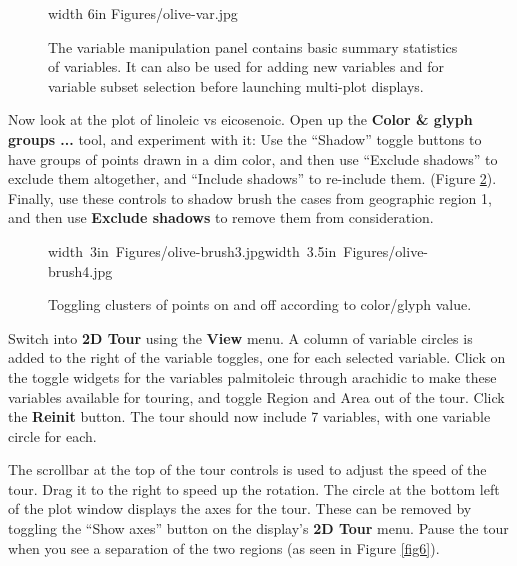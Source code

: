 \documentclass[11pt]{article}
\def\Widget#1{\textbf{#1}}
\begin{document}
\begin{figure}[htp]
\pdfimage width 6in {Figures/olive-var.jpg}
\caption{The variable manipulation panel contains basic summary 
statistics of variables. It can also be used for adding new variables
and for variable subset selection before launching multi-plot
displays.
}%
\label{fig4}
\end{figure}

Now look at the plot of linoleic vs eicosenoic. Open up the
\Widget{Color \& glyph groups ...} tool, and experiment with it: Use
the ``Shadow'' toggle buttons to have groups of points drawn in a dim
color, and then use ``Exclude shadows'' to exclude them altogether,
and ``Include shadows'' to re-include them.  (Figure \ref{fig5}).
Finally, use these controls to shadow brush the cases from geographic
region 1, and then use \Widget{Exclude shadows} to remove them from
consideration.

\begin{figure}[htp]
\hbox{\pdfimage width 3in {Figures/olive-brush3.jpg}\pdfimage width 3.5in {Figures/olive-brush4.jpg}}
\caption{Toggling clusters of points on and off according to color/glyph value.}
\label{fig5}
\end{figure}

Switch into \Widget{2D Tour} using the \Widget{View} menu. A column of
variable circles is added to the right of the variable toggles, one
for each selected variable.  Click on the toggle widgets for the
variables palmitoleic through arachidic to make these variables
available for touring, and toggle Region and Area out of the tour.
Click the \Widget{Reinit} button.  The tour should now include 7
variables, with one variable circle for each.

The scrollbar at the top of the tour controls is used to adjust the
speed of the tour.  Drag it to the right to speed up the rotation.
The circle at the bottom left of the plot window displays the axes for
the tour. These can be removed by toggling the ``Show axes'' button on
the display's \Widget{2D Tour} menu.  Pause the tour when you see a
separation of the two regions (as seen in Figure \ref{fig6}).
\end{document}
